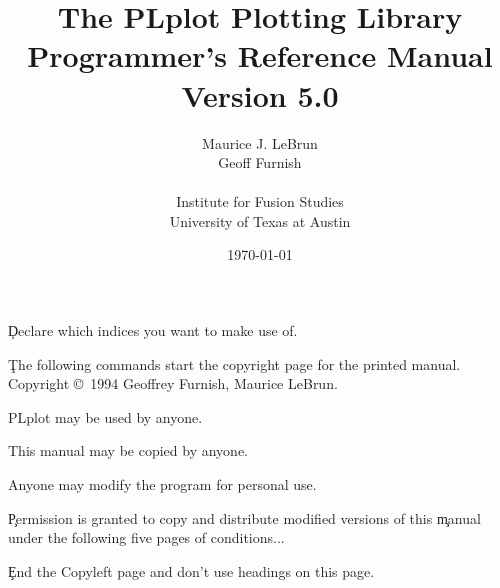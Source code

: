 %
%
%
%
%
%

\pagestyle{headings}



\c Declare which indices you want to make use of.

\title{ The PLplot Plotting Library \\ 
        Programmer's Reference Manual \\
        Version 5.0}
\author{
        Maurice J. LeBrun\\
        Geoff Furnish\\
\\
        Institute for Fusion Studies\\
        University of Texas at Austin\\
        }

\date{\today}
\maketitle

\c The following commands start the copyright page for the printed manual.
\clearpage
\vspace{0pt plus 1filll}
Copyright \copyright\ 1994 Geoffrey Furnish, Maurice LeBrun.

PLplot may be used by anyone.

This manual may be copied by anyone.

Anyone may modify the program for personal use.

\c Permission is granted to copy and distribute modified versions of this
\c manual under the following five pages of conditions...

\c End the Copyleft page and don't use headings on this page.
\clearpage
\pagestyle{headings}

\tableofcontents

